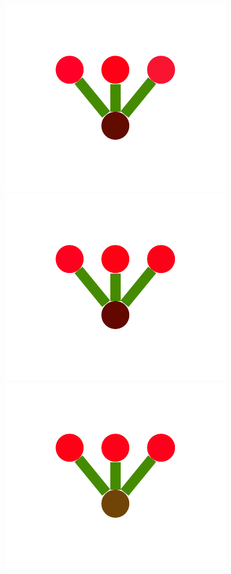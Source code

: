 \documentclass[a4paper,10pt]{article}
\begin{document}
\begin{figure}
{    \includegraphics[scale=.26]{../figures/vector/4-2-1-noisyprog-postA-3.pdf}
    \includegraphics[scale=.26]{../figures/vector/4-2-1-noisyprog-postA-4.pdf}
    \includegraphics[scale=.26]{../figures/vector/4-2-1-noisyprog-postA-5.pdf}
}
\end{figure}
\end{document}
